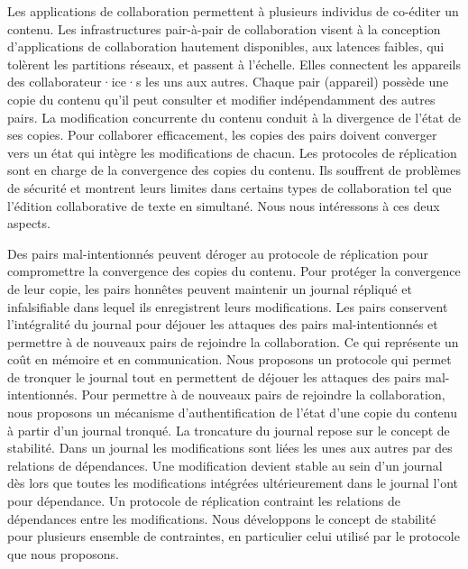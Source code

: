 \begin{ThesisAbstract}
\begin{FrenchAbstract}
Les applications de collaboration permettent à plusieurs individus de co-éditer un contenu.
Les infrastructures pair-à-pair de collaboration visent à la conception d’applications de collaboration hautement disponibles, aux latences faibles, qui tolèrent les partitions
réseaux, et passent à l’échelle.
Elles connectent les appareils des collaborateur·ice·s les uns aux autres.
Chaque pair (appareil) possède une copie du contenu qu’il peut consulter et modifier indépendamment des autres pairs.
La modification concurrente du contenu conduit à la divergence de l'état de ses copies.
Pour collaborer efficacement, les copies des pairs doivent converger vers un état qui intègre les modifications de chacun.
Les protocoles de réplication sont en charge de la convergence des copies du contenu.
Ils souffrent de problèmes de sécurité et montrent leurs limites dans certains types de collaboration tel que l'édition collaborative de texte en simultané.
Nous nous intéressons à ces deux aspects.


Des pairs mal-intentionnés peuvent déroger au protocole de réplication pour compromettre la convergence des copies du contenu.
Pour protéger la convergence de leur copie, les pairs honnêtes peuvent maintenir un journal répliqué et infalsifiable dans lequel ils enregistrent leurs modifications.
Les pairs conservent l’intégralité du journal pour déjouer les attaques des pairs mal-intentionnés et permettre à de nouveaux pairs de rejoindre la collaboration.
Ce qui représente un coût en mémoire et en communication.
Nous proposons un protocole qui permet de tronquer le journal tout en permettent de déjouer les attaques des pairs mal-intentionnés.
Pour permettre à de nouveaux pairs de rejoindre la collaboration, nous proposons un mécanisme d’authentification de l’état d’une copie du contenu à partir d’un journal tronqué. La troncature du journal repose sur le concept de stabilité. Dans un journal les modifications sont liées les unes aux autres par des relations de dépendances.
Une modification devient stable au sein d'un journal dès lors que toutes les modifications intégrées ultérieurement dans le journal l’ont pour dépendance.
Un protocole de réplication contraint les relations de dépendances entre les modifications. Nous développons le concept de stabilité pour plusieurs ensemble de contraintes, en particulier celui utilisé par le protocole que nous proposons.


\end{FrenchAbstract}
\end{ThesisAbstract}
